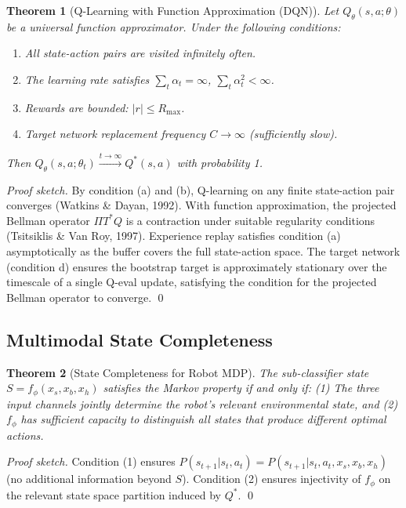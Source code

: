 \documentclass[12pt,a4paper]{article}
\theoremstyle{definition}
\theoremstyle{plain}
\newtheorem{theorem}{Theorem}[section]
\theoremstyle{remark}
\newcommand{\Qeval}{Q_\theta}
\begin{document}
\begin{theorem}[Q-Learning with Function Approximation (DQN)]
\label{thm:dqn_conv}
Let $\Qeval(s,a;\theta)$ be a universal function approximator. Under the following conditions:
\begin{enumerate}[label=(\alph*)]
  \item All state-action pairs are visited infinitely often.
  \item The learning rate satisfies $\sum_t \alpha_t = \infty$, $\sum_t \alpha_t^2 < \infty$.
  \item Rewards are bounded: $|r| \le R_{\max}$.
  \item Target network replacement frequency $C \to \infty$ (sufficiently slow).
\end{enumerate}
Then $\Qeval(s,a;\theta_t) \xrightarrow{t \to \infty} Q^*(s,a)$ with probability 1.
\end{theorem}

\begin{proof}[Proof sketch]
By condition (a) and (b), Q-learning on any finite state-action pair converges (Watkins \& Dayan, 1992). With function approximation, the projected Bellman operator $\Pi T^* Q$ is a contraction under suitable regularity conditions (Tsitsiklis \& Van Roy, 1997). Experience replay satisfies condition (a) asymptotically as the buffer covers the full state-action space. The target network (condition d) ensures the bootstrap target is approximately stationary over the timescale of a single Q-eval update, satisfying the condition for the projected Bellman operator to converge. \qed
\end{proof}

\subsection{Multimodal State Completeness}

\begin{theorem}[State Completeness for Robot MDP]
\label{thm:state_complete}
The sub-classifier state $S = f_\phi(x_s, x_b, x_h)$ satisfies the Markov property if and only if:
(1) The three input channels jointly determine the robot's relevant environmental state, and
(2) $f_\phi$ has sufficient capacity to distinguish all states that produce different optimal actions.
\end{theorem}

\begin{proof}[Proof sketch]
Condition (1) ensures $P(s_{t+1} | s_t, a_t) = P(s_{t+1} | s_t, a_t, x_s, x_b, x_h)$ (no additional information beyond $S$). Condition (2) ensures injectivity of $f_\phi$ on the relevant state space partition induced by $Q^*$. \qed
\end{proof}
\end{document}
